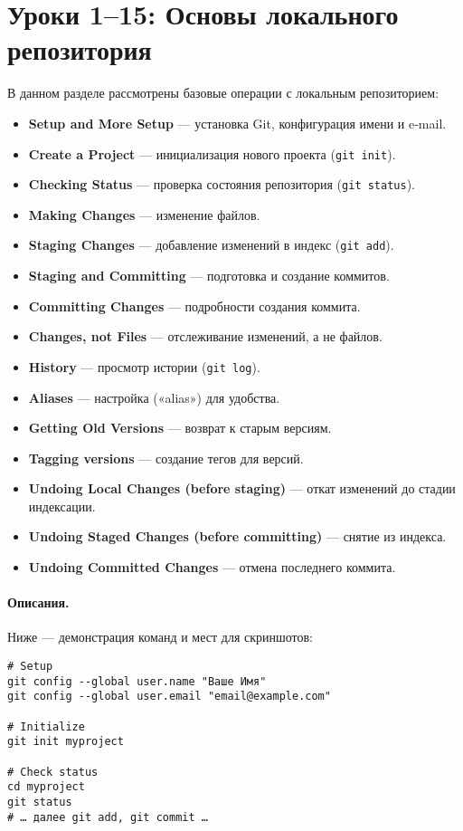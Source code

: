 \section{Уроки 1--15: Основы локального репозитория}\label{sec:git-immersion-local-repo}
В данном разделе рассмотрены базовые операции с локальным репозиторием:

\begin{itemize}
    \item \textbf{Setup and More Setup} — установка Git, конфигурация имени и e‑mail.
    \item \textbf{Create a Project} — инициализация нового проекта (\texttt{git init}).
    \item \textbf{Checking Status} — проверка состояния репозитория (\texttt{git status}).
    \item \textbf{Making Changes} — изменение файлов.
    \item \textbf{Staging Changes} — добавление изменений в индекс (\texttt{git add}).
    \item \textbf{Staging and Committing} — подготовка и создание коммитов.
    \item \textbf{Committing Changes} — подробности создания коммита.
    \item \textbf{Changes, not Files} — отслеживание изменений, а не файлов.
    \item \textbf{History} — просмотр истории (\texttt{git log}).
    \item \textbf{Aliases} — настройка («alias») для удобства.
    \item \textbf{Getting Old Versions} — возврат к старым версиям.
    \item \textbf{Tagging versions} — создание тегов для версий.
    \item \textbf{Undoing Local Changes (before staging)} — откат изменений до стадии индексации.
    \item \textbf{Undoing Staged Changes (before committing)} — снятие из индекса.
    \item \textbf{Undoing Committed Changes} — отмена последнего коммита.
\end{itemize}

\paragraph{Описания.} Ниже — демонстрация команд и мест для скриншотов:

\begin{verbatim}
# Setup
git config --global user.name "Ваше Имя"
git config --global user.email "email@example.com"

# Initialize
git init myproject

# Check status
cd myproject
git status
# … далее git add, git commit …
\end{verbatim}

